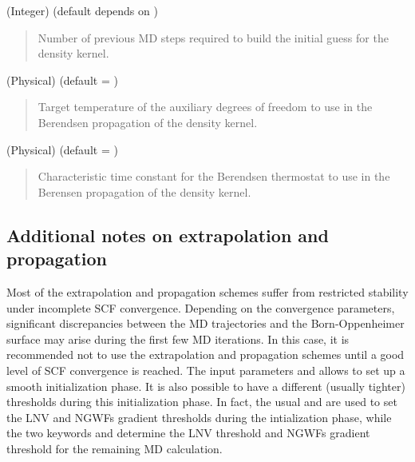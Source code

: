 \documentclass[letterpaper,10pt,english]{sphinxmanual}
\begin{document}
 (Integer) (default depends on )
\begin{quote}

\begin{DUlineblock}{0em}
\item[] Number of previous MD steps required to build the initial guess for the density kernel.
\end{DUlineblock}
\end{quote}

 (Physical) (default = )
\begin{quote}

\begin{DUlineblock}{0em}
\item[] Target temperature of the auxiliary degrees of freedom to use in the Berendsen propagation of the density kernel.
\end{DUlineblock}
\end{quote}

 (Physical) (default = )
\begin{quote}

\begin{DUlineblock}{0em}
\item[] Characteristic time constant for the Berendsen thermostat to use in the Berensen propagation of the density kernel.
\end{DUlineblock}
\end{quote}


\subsection{Additional notes on extrapolation and propagation}
\label{\detokenize{BOMD:additional-notes-on-extrapolation-and-propagation}}
Most of the
extrapolation and propagation schemes suffer from restricted stability
under incomplete SCF convergence. Depending on the convergence
parameters, significant discrepancies between the MD trajectories and
the Born-Oppenheimer surface may arise during the first few MD
iterations. In this case, it is recommended not to use the extrapolation
and propagation schemes until a good level of SCF convergence is
reached. The input parameters  and
 allows to set up a smooth initialization phase.
It is also possible to have a different (usually tighter) thresholds
during this initialization phase. In fact, the usual
 and  are used to set the
LNV and NGWFs gradient thresholds during the intialization phase, while
the two keywords  and 
determine the LNV threshold and NGWFs gradient threshold for the
remaining MD calculation.
\end{document}
